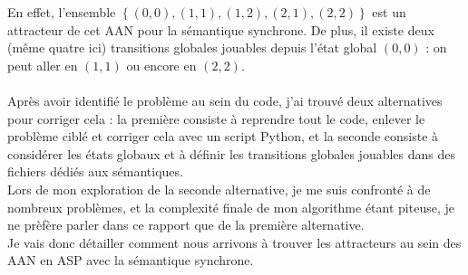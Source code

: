 \documentclass[12pt,a4paper]{article}
\begin{document}
\begin{center}
\end{center}
En effet, l'ensemble $\left\{(0,0),(1,1),(1,2),(2,1),(2,2)\right\}$ est un attracteur de cet AAN pour la sémantique synchrone. De plus, il existe deux (même quatre ici) transitions globales jouables depuis l'état global $(0,0)$ : 
on peut aller en $(1,1)$ ou encore en $(2,2)$.\\ \\
Après avoir identifié le problème au sein du code, j'ai trouvé deux alternatives pour corriger cela : la première consiste à reprendre tout le code, enlever le problème ciblé et corriger cela avec un script Python, et la seconde 
consiste à considérer les états globaux et à définir les transitions globales jouables dans des fichiers dédiés aux sémantiques.\\
Lors de mon exploration de la seconde alternative, je me suis confronté à de nombreux problèmes, et la complexité finale de mon algorithme étant piteuse, je ne prèfère parler dans ce rapport que de la première alternative.\\
Je vais donc détailler comment nous arrivons à trouver les attracteurs au sein des AAN en ASP avec la sémantique synchrone.
\end{document}

